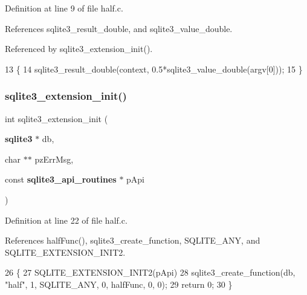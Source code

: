 Definition at line 9 of file half.\+c.



References sqlite3\+\_\+result\+\_\+double, and sqlite3\+\_\+value\+\_\+double.



Referenced by sqlite3\+\_\+extension\+\_\+init().


\begin{DoxyCode}
13  \{
14   sqlite3_result_double(context, 0.5*sqlite3_value_double(argv[0]));
15 \}
\end{DoxyCode}
\mbox{\label{half_8c_aa42ef32f7f9c08b35a1c1984e1006606}} 
\subsubsection{sqlite3\+\_\+extension\+\_\+init()}
{\footnotesize\ttfamily int sqlite3\+\_\+extension\+\_\+init (\begin{DoxyParamCaption}\item[{\textbf{ sqlite3} $\ast$}]{db,  }\item[{char $\ast$$\ast$}]{pz\+Err\+Msg,  }\item[{const \textbf{ sqlite3\+\_\+api\+\_\+routines} $\ast$}]{p\+Api }\end{DoxyParamCaption})}



Definition at line 22 of file half.\+c.



References half\+Func(), sqlite3\+\_\+create\+\_\+function, S\+Q\+L\+I\+T\+E\+\_\+\+A\+NY, and S\+Q\+L\+I\+T\+E\+\_\+\+E\+X\+T\+E\+N\+S\+I\+O\+N\+\_\+\+I\+N\+I\+T2.


\begin{DoxyCode}
26  \{
27   SQLITE_EXTENSION_INIT2(pApi)
28   sqlite3_create_function(db, \textcolor{stringliteral}{"half"}, 1, SQLITE_ANY, 0, halfFunc, 0, 0);
29   \textcolor{keywordflow}{return} 0;
30 \}
\end{DoxyCode}
